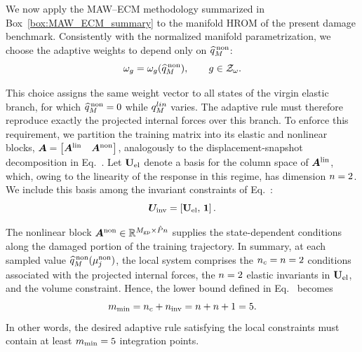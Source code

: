 \documentclass[preprint,10pt]{elsarticle}  %
\begin{document}
We now apply the MAW--ECM methodology summarized in
Box~\ref{box:MAW_ECM_summary} to the manifold HROM of the present
damage benchmark. Consistently with the normalized manifold
parametrization, we choose the adaptive weights to depend only on
\(\widehat{q}^{\mathrm{\,non}}_{M}\):
\begin{equation}
\label{eq:normalizedTRAININGw}
\omega_{g}=\omega_{g}(\widehat{q}^{\mathrm{\,non}}_{M}),
\qquad
g\in\mathcal{Z}_{\omega}.
\end{equation}


This choice assigns the same weight vector to all states of the virgin
elastic branch, for which \(\widehat{q}^{\mathrm{\,non}}_{M}=0\) while \({q}_M^{lin}\) varies. The
adaptive rule must therefore reproduce exactly the projected internal
forces over this branch. To enforce this requirement, we partition the
training matrix into its elastic and nonlinear blocks,
$\bm{A}=\begin{bmatrix} \bm{A}^{\textrm{lin}} & \bm{A}^{\textrm{non}} \end{bmatrix}$,
analogously to the displacement-snapshot decomposition in
Eq.~. Let \(\mathbf{U}_{\mathrm{el}}\) denote a basis for the
column space of \(\bm{A}^{\textrm{lin}}\), which, owing to the linearity of the
response in this regime, has dimension \(n=2\). We include this basis
among the invariant constraints of Eq.~:
\begin{equation}
\label{eq:Uinv_damage}
\boldsymbol{U}_{\mathrm{inv}}=
\left[
\mathbf{U}_{\mathrm{el}},\,
\bm{1}
\right].
\end{equation}

The nonlinear block
\(\bm{A}^{\textrm{non}}\in\mathbb{R}^{M_{\mathrm{gp}} \times \hat{P}n}\) supplies the state-dependent
conditions along the damaged portion of the training trajectory. In
summary, at each sampled value \(\widehat{q}^{\mathrm{\,non}}_{M}(\mu_{j}^{\mathrm{non}})\), the local
system comprises the \(n_c=n=2\) conditions associated with the
projected internal forces, the \(n=2\) elastic invariants in \(\mathbf{U}_{\mathrm{el}}\),
and the volume constraint. Hence, the lower bound defined in
Eq.~ becomes
\begin{equation}
\label{eq:ncond_damage}
m_{\textrm{min}} = n_c+n_{\mathrm{inv}} = n+n+1 = 5.
\end{equation}
In other words, the desired adaptive rule satisfying the local
constraints must contain at least \(m_{\textrm{min}}=5\) integration points.
\end{document}
